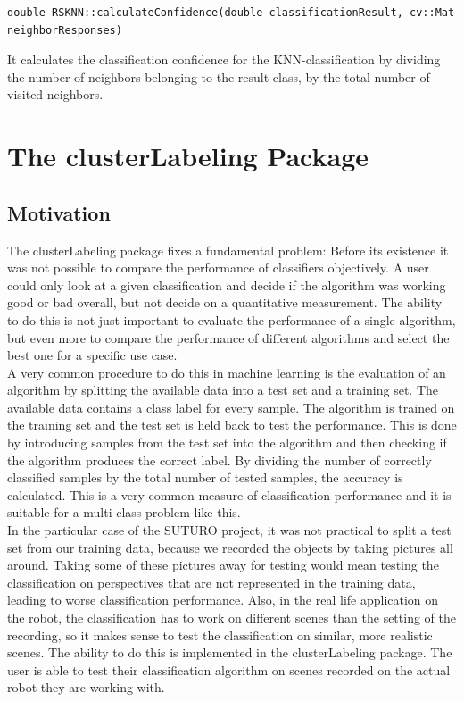 \documentclass[main.tex]{subfiles}
\begin{document}
\begin{lstlisting}
double RSKNN::calculateConfidence(double classificationResult, cv::Mat neighborResponses)
\end{lstlisting}

It calculates the classification confidence for the KNN-classification by dividing the number of neighbors belonging to the result class, by the total number of visited neighbors. 

\section{The clusterLabeling Package}\label{clusterLabeling}
\subsection{Motivation}
The clusterLabeling package fixes a fundamental problem: Before its existence it was not possible to compare the performance of classifiers objectively. A user could only look at a given classification and decide if the algorithm was working good or bad overall, but not decide on a quantitative measurement. The ability to do this is not just important to evaluate the performance of a single algorithm, but even more to compare the performance of different algorithms and select the best one for a specific use case.\\

A very common procedure to do this in machine learning is the evaluation of an algorithm by splitting the available data into a test set and a training set. The available data contains a class label for every sample. The algorithm is trained on the training set and the test set is held back to test the performance. This is done by introducing samples from the test set into the algorithm and then checking if the algorithm produces the correct label. By dividing the number of correctly classified samples by the total number of tested samples, the accuracy is calculated. This is a very common measure of classification performance and it is suitable for a multi class problem like this.\\

In the particular case of the SUTURO project, it was not practical to split a test set from our training data, because we recorded the objects by taking pictures all around. Taking some of these pictures away for testing would mean testing the classification on perspectives that are not represented in the training data, leading to worse classification performance. Also, in the real life application on the robot, the classification has to work on different scenes than the setting of the recording, so it makes sense to test the classification on similar, more realistic scenes. The ability to do this is implemented in the clusterLabeling package. The user is able to test their classification algorithm on scenes recorded on the actual robot they are working with.  
\end{document}
